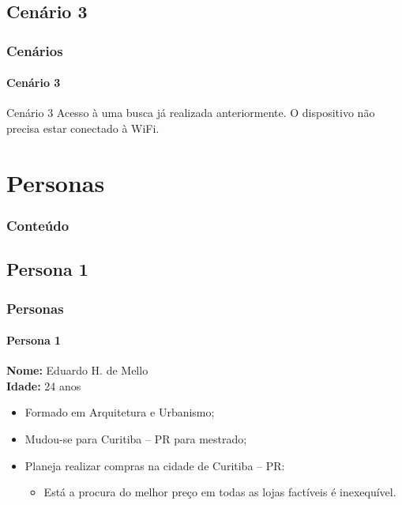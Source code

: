 \documentclass[14pt,beamer]{beamer}
\begin{document}
\subsection{Cenário 3}
\begin{frame}
	\frametitle{Cenários}
	\framesubtitle{Cenário 3}

    \begin{block}{Cenário 3}
    Acesso à uma busca já realizada anteriormente.  O dispositivo
    não precisa estar conectado à WiFi.
    \end{block}
\end{frame}

\section{Personas}

\begin{frame}
	\frametitle{Conteúdo}
    \begin{multicols}{2}
        \small
    \end{multicols}
\end{frame}
\subsection{Persona 1}

\begin{frame}
	\frametitle{Personas}
    \framesubtitle{Persona 1}

    \textbf{Nome:} Eduardo H. de Mello \\
    \textbf{Idade:} 24 anos \\

    \begin{itemize}
        \item Formado em Arquitetura e Urbanismo;
        \item Mudou-se para Curitiba -- PR para mestrado;
        \item Planeja realizar compras na cidade de Curitiba -- PR:
        \begin{itemize}
            \item Está a procura do melhor preço em todas as lojas factíveis
                é inexequível.
        \end{itemize}
    \end{itemize}
\end{frame}
\end{document}
